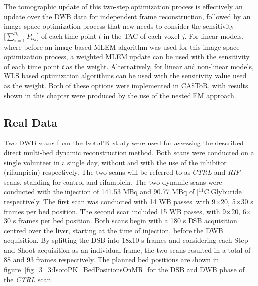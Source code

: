 The tomographic update of this two-step optimization process is effectively an update over the DWB data for independent frame reconstruction, followed by an image space optimization process that now needs to consider the sensitivity $\big[\sum_{i=1}^{n_i} P_{tij}\big]$ of each time point $t$ in the TAC of each voxel $j$. For linear models, where before an image based MLEM algorithm was used for this image space optimization process, a weighted MLEM update can be used with the sensitivity of each time point $t$ as the weight. Alternatively, for linear and non-linear models, WLS based optimization algorithms can be used with the sensitivity value used as the weight. Both of these options were implemented in CASToR, with results shown in this chapter were produced by the use of the nested EM approach.
%

%
\subsection{Real Data}
Two DWB scans from the IsotoPK study were used for assessing the described direct multi-bed dynamic reconstruction method. Both scans were conducted on a single volunteer in a single day, without and with the use of the inhibitor (rifampicin) respectively. The two scans will be referred to as \textit{CTRL} and \textit{RIF} scans, standing for control and rifampicin. %
The two dynamic scans were conducted with the injection of 141.53 MBq and 90.77 MBq of [$^{11}$C]Glyburide respectively. The first scan was conducted with 14 WB passes, with 9$\times$20, 5$\times$30 s frames per bed position. The second scan included 15 WB passes, with 9$\times$20, 6$\times$30 s frames per bed position. Both scans begin with a 180 s DSB acquisition centred over the liver, starting at the time of injection, before the DWB acquisition. By splitting the DSB into 18x10 s frames and considering each Step and Shoot acquisition as an individual frame, the two scans resulted in a total of 88 and 93 frames respectively. 
The planned bed positions are shown in figure~\ref{fig_3_3:IsotoPK_BedPositionsOnMR} for the DSB and DWB phase of the \textit{CTRL} scan. 

